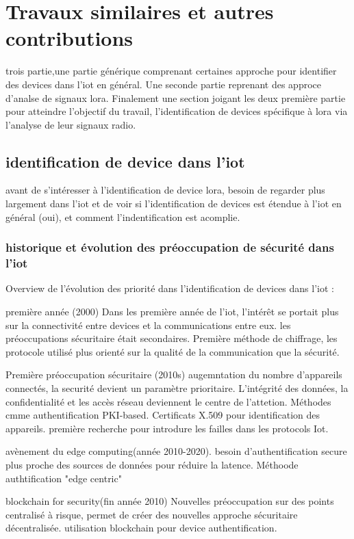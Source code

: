 \chapter{Travaux similaires et autres contributions}

trois partie,une partie générique comprenant certaines approche pour identifier des devices dans l'iot en général. Une seconde partie reprenant des approce d'analse de signaux lora. Finalement une section joigant les deux première partie pour atteindre l'objectif du travail, l'identification de devices spécifique à lora via l'analyse de leur signaux radio.


\section{identification de device dans l'iot}

avant de s'intéresser à l'identification de device lora, besoin de regarder plus largement dans l'iot et de voir si l'identification de devices est étendue à l'iot en général (oui), et comment l'indentification est acomplie.

\subsection{historique et évolution des préoccupation de sécurité dans l'iot}

Overview de l'évolution des priorité dans l'identification de devices dans l'iot :

première année (2000)
Dans les première année de l'iot, l'intérêt se portait plus sur la connectivité entre devices et la communications entre eux. les préoccupations sécuritaire était secondaires. Première méthode de chiffrage, les protocole utilisé plus orienté sur la qualité de la communication que la sécurité.

Première préoccupation sécuritaire (2010s)
augemntation du nombre d'appareils connectés, la securité devient un paramètre prioritaire. L'intégrité des données, la confidentialité et les accès réseau deviennent le centre de l'attetion. Méthodes cmme authentification PKI-based. Certificats X.509 pour identification des appareils. première recherche pour introdure les failles dans les protocols Iot.

avènement du edge computing(année 2010-2020).
besoin d'authentification secure plus proche des sources de données pour réduire la latence. Méthoode authtification "edge centric"

blockchain for security(fin année 2010)
Nouvelles préoccupation sur des points centralisé à risque, permet de créer des nouvelles approche sécuritaire décentralisée.
utilisation blockchain pour device authentification.

